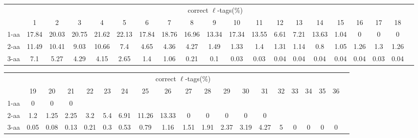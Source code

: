 \documentclass{article}[12pt]
\begin{document}
\begin{landscape}

\begin{table}[h]\tiny
\vspace{3mm}
{\centering
\begin{center}
\begin{tabular}{|l|c|c|c|c|c|c|c|c|c|c|c|c|c|c|c|c|c|c|c|}
  \hline
  & \multicolumn{ 18 }{|c|}{correct $\ell$-tags(\%)} \\
  \cline{2- 19}
    & 1 & 2 & 3 & 4 & 5 & 6 & 7 & 8 & 9 & 10 & 11 & 12 & 13 & 14 & 15 & 16 & 17 & 18\\
  \hline
1-aa  & 17.84 & 20.03 & 20.75 & 21.62 & 22.13 & 17.84 & 18.76 & 16.96 & 13.34 & 17.34 & 13.55 & 6.61 & 7.21 & 13.63 & 1.04 & 0 & 0 & 0\\
2-aa  & 11.49 & 10.41 & 9.03 & 10.66 & 7.4 & 4.65 & 4.36 & 4.27 & 1.49 & 1.33 & 1.4 & 1.31 & 1.14 & 0.8 & 1.05 & 1.26 & 1.3 & 1.26\\
3-aa  & 7.1 & 5.27 & 4.29 & 4.15 & 2.65 & 1.4 & 1.06 & 0.21 & 0.1 & 0.03 & 0.03 & 0.04 & 0.04 & 0.04 & 0.04 & 0.04 & 0.03 & 0.04\\
 \hline
\end{tabular}
\end{center}
\par}
\centering

\vspace{3mm}
\end{table}
\begin{table}[h]\tiny
\vspace{3mm}
{\centering
\begin{center}
\begin{tabular}{|l|c|c|c|c|c|c|c|c|c|c|c|c|c|c|c|c|c|c|c|}
  \hline
  & \multicolumn{ 18 }{|c|}{correct $\ell$-tags(\%)} \\
  \cline{2- 19}
    & 19 & 20 & 21 & 22 & 23 & 24 & 25 & 26 & 27 & 28 & 29 & 30 & 31 & 32 & 33 & 34 & 35 & 36\\
  \hline
1-aa  & 0 & 0 & 0 &  &  &  &  &  &  &  &  &  &  &  &  &  &  & \\
2-aa  & 1.2 & 1.25 & 2.25 & 3.2 & 5.4 & 6.91 & 11.26 & 13.33 & 0 & 0 & 0 & 0 & 0 &  &  &  &  & \\
3-aa  & 0.05 & 0.08 & 0.13 & 0.21 & 0.3 & 0.53 & 0.79 & 1.16 & 1.51 & 1.91 & 2.37 & 3.19 & 4.27 & 5 & 0 & 0 & 0 & 0\\
 \hline
\end{tabular}
\end{center}
\par}
\centering


\end{table}
\end{landscape}
\end{document}
